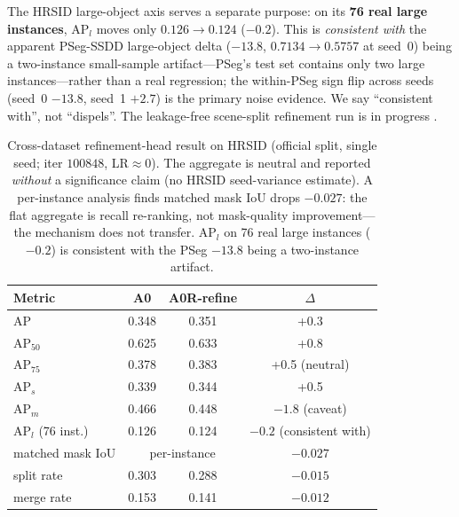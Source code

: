 The HRSID large-object axis serves a separate purpose: on its \textbf{76 real large instances}, AP$_{l}$ moves only $0.126\!\rightarrow\!0.124$ ($-0.2$). This is \emph{consistent with} the apparent PSeg-SSDD large-object delta ($-13.8$, $0.7134\!\rightarrow\!0.5757$ at seed~0) being a two-instance small-sample artifact---PSeg's test set contains only two large instances---rather than a real regression; the within-PSeg sign flip across seeds (seed~0 $-13.8$, seed~1 $+2.7$) is the primary noise evidence. We say ``consistent with'', not ``dispels''. The leakage-free scene-split refinement run is in progress .

\begin{table}[t]
\centering
\caption{Cross-dataset refinement-head result on HRSID (official split, single seed; iter $100848$, LR$\approx0$). The aggregate is neutral and reported \emph{without} a significance claim (no HRSID seed-variance estimate). A per-instance analysis finds matched mask IoU drops $-0.027$: the flat aggregate is recall re-ranking, not mask-quality improvement---the mechanism does not transfer. AP$_{l}$ on 76 real large instances ($-0.2$) is consistent with the PSeg $-13.8$ being a two-instance artifact.}
\label{tab:main-hrsid}
\begin{tabular}{@{}lccc@{}}
\toprule
Metric & A0 & A0R-refine & $\Delta$ \\
\midrule
AP                  & 0.348 & 0.351 & +0.3 \\
AP$_{50}$           & 0.625 & 0.633 & +0.8 \\
AP$_{75}$           & 0.378 & 0.383 & +0.5 \;(neutral) \\
AP$_{s}$            & 0.339 & 0.344 & +0.5 \\
AP$_{m}$            & 0.466 & 0.448 & $-1.8$ \;(caveat) \\
AP$_{l}$ (76 inst.) & 0.126 & 0.124 & $-0.2$ \;(consistent with) \\
matched mask IoU    & \multicolumn{2}{c}{per-instance} & $-0.027$ \\
split rate          & 0.303 & 0.288 & $-0.015$ \\
merge rate          & 0.153 & 0.141 & $-0.012$ \\
\bottomrule
\end{tabular}
\end{table}

